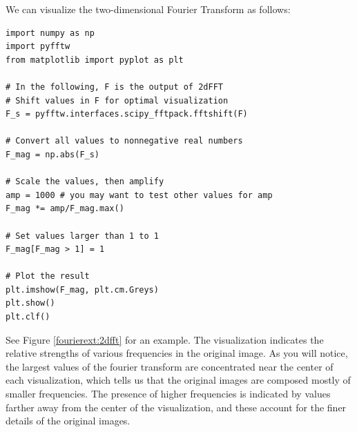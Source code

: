 We can visualize the two-dimensional Fourier Transform as follows:
\begin{lstlisting}
import numpy as np
import pyfftw
from matplotlib import pyplot as plt

# In the following, F is the output of 2dFFT
# Shift values in F for optimal visualization
F_s = pyfftw.interfaces.scipy_fftpack.fftshift(F)

# Convert all values to nonnegative real numbers
F_mag = np.abs(F_s)

# Scale the values, then amplify
amp = 1000 # you may want to test other values for amp
F_mag *= amp/F_mag.max()

# Set values larger than 1 to 1
F_mag[F_mag > 1] = 1

# Plot the result
plt.imshow(F_mag, plt.cm.Greys)
plt.show()
plt.clf()
\end{lstlisting}



See Figure \ref{fourierext:2dfft} for an example.
The visualization indicates the relative strengths of various frequencies in the original image.
As you will notice, the largest values of the fourier transform are concentrated near the center of each visualization, which tells us that the original images are
composed mostly of smaller frequencies.
The presence of higher frequencies is indicated by values farther away from the center of the visualization, and these account for the
finer details of the original images.
